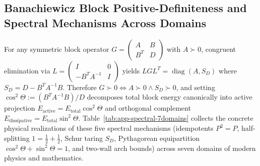 \documentclass[10pt]{article}
\renewcommand{\_}{\OrigUnderscore\hspace{0pt}}
\numberwithin{equation}{section}
\begin{document}
\subsection{Banachiewicz Block Positive-Definiteness and Spectral Mechanisms Across Domains}\label{subsec:app-ns-spectral-5}

For any symmetric block operator $G = \begin{pmatrix} A & B \\ B^T & D \end{pmatrix}$ with $A \succ 0$, congruent elimination via $L = \begin{pmatrix} I & 0 \\ -B^T A^{-1} & I \end{pmatrix}$ yields $L G L^T = \operatorname{diag}(A, S_D)$ where $S_D = D - B^T A^{-1}B$. Therefore $G \succ 0 \iff A \succ 0 \land S_D \succ 0$, and setting $\cos^2\Theta := (B^T A^{-1}B)/D$ decomposes total block energy canonically into active projection $E_{\mathrm{active}} = E_{\mathrm{total}}\cos^2\Theta$ and orthogonal complement $E_{\mathrm{dissipative}} = E_{\mathrm{total}}\sin^2\Theta$. Table~\ref{tab:app-spectral-7domains} collects the concrete physical realizations of these five spectral mechanisms (idempotents $P^2=P$, half-splitting $1 = \frac{1}{2}+\frac{1}{2}$, Schur taring $S_D$, Pythagorean equipartition $\cos^2\Theta + \sin^2\Theta = 1$, and two-wall arch bounds) across seven domains of modern physics and mathematics.
\end{document}

